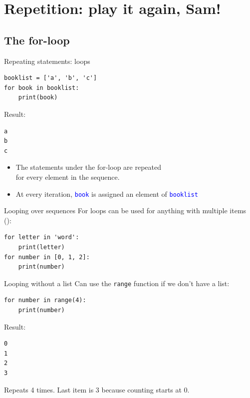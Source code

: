 \documentclass[aspectratio=169,usenames,dvipsnames]{beamer}
\begin{document}
\section{Repetition: play it again, Sam!}
\subsection{The for-loop}
\frame{\tableofcontents[currentsection]}

\begin{frame}[fragile]{Repeating statements: loops}
\begin{lstlisting}
booklist = ['a', 'b', 'c']
for book in booklist:
    print(book)
\end{lstlisting}
Result:
\begin{lstlisting}
a
b
c
\end{lstlisting}

\begin{itemize}
\item The statements under the for-loop are repeated \\
    for every element in the sequence.
\item At every iteration, \textcolor{blue}{\texttt{book}} is assigned
    an element of \textcolor{blue}{\texttt{booklist}}
\end{itemize}
\end{frame}

\begin{frame}[fragile]{Looping over sequences}
For loops can be used for anything with multiple items ():
\begin{lstlisting}
for letter in 'word':
    print(letter)
for number in [0, 1, 2]:
    print(number)
\end{lstlisting}
\end{frame}



\begin{frame}[fragile]{Looping without a list}
Can use the \textcolor{OliveGreen}{\texttt{range}} function
if we don't have a list:
\begin{lstlisting}
for number in range(4):
    print(number)
\end{lstlisting}

Result:
\begin{lstlisting}
0
1
2
3
\end{lstlisting}

Repeats 4 times. Last item is 3 because counting starts at 0.
\end{frame}
\end{document}
